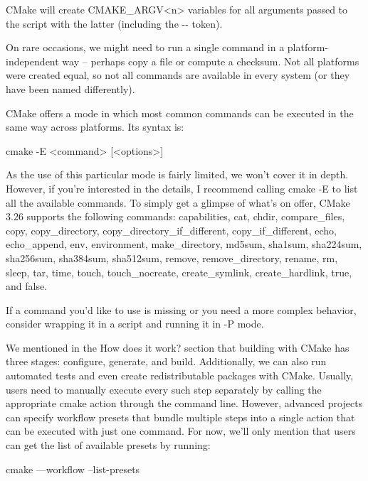 CMake will create CMAKE\_ARGV<n> variables for all arguments passed to the script with the latter (including the -{}- token).


On rare occasions, we might need to run a single command in a platform-independent way – perhaps copy a file or compute a checksum. Not all platforms were created equal, so not all commands are available in every system (or they have been named differently).

CMake offers a mode in which most common commands can be executed in the same way across platforms. Its syntax is:

\begin{shell}
cmake -E <command> [<options>]
\end{shell}

As the use of this particular mode is fairly limited, we won’t cover it in depth. However, if you’re interested in the details, I recommend calling cmake -E to list all the available commands. To simply get a glimpse of what’s on offer, CMake 3.26 supports the following commands: capabilities, cat, chdir, compare\_files, copy, copy\_directory, copy\_directory\_if\_different, copy\_if\_different, echo, echo\_append, env, environment, make\_directory, md5sum, sha1sum, sha224sum, sha256sum, sha384sum, sha512sum, remove, remove\_directory, rename, rm, sleep, tar, time, touch, touch\_nocreate, create\_symlink, create\_hardlink, true, and false.

If a command you’d like to use is missing or you need a more complex behavior, consider wrapping it in a script and running it in -P mode.


We mentioned in the How does it work? section that building with CMake has three stages: configure, generate, and build. Additionally, we can also run automated tests and even create redistributable packages with CMake. Usually, users need to manually execute every such step separately by calling the appropriate cmake action through the command line. However, advanced projects can specify workflow presets that bundle multiple steps into a single action that can be executed with just one command. For now, we’ll only mention that users can get the list of available presets by running:

\begin{shell}
cmake ––workflow --list-presets
\end{shell}

